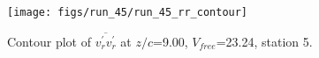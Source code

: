 \begin{figure}[H]
\centering
\texttt{[image: figs/run\_45/run\_45\_rr\_contour]}
\caption{Contour plot of $\overline{v_{r}^{\prime} v_{r}^{\prime}}$ at $z/c$=9.00, $V_{free}$=23.24, station 5.}
\label{fig:run_45_rr_contour}
\end{figure}


